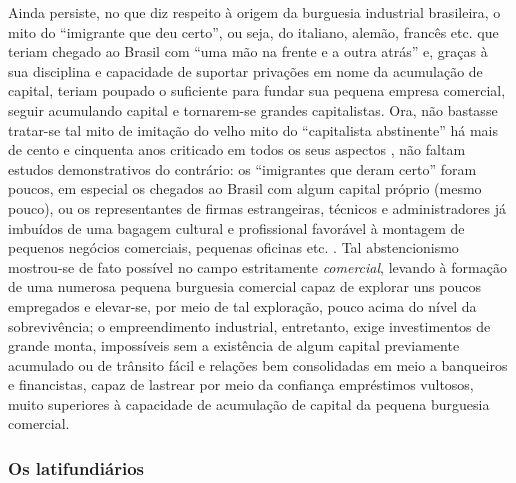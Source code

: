 Ainda persiste, no que diz respeito à origem da burguesia industrial brasileira, o mito do ``imigrante que deu certo'', ou seja, do italiano, alemão, francês etc. que teriam chegado ao Brasil com ``uma mão na frente e a outra atrás'' e, graças à sua disciplina e capacidade de suportar privações em nome da acumulação de capital, teriam poupado o suficiente para fundar sua pequena empresa comercial, seguir acumulando capital e tornarem-se grandes capitalistas. Ora, não bastasse tratar-se tal mito de imitação do velho mito do ``capitalista abstinente'' há mais de cento e cinquenta anos criticado em todos os seus aspectos \cite[pp.~689-697]{marx_capital1vol2_2001}, não faltam estudos demonstrativos do contrário: os ``imigrantes que deram certo'' foram poucos, em especial os chegados ao Brasil com algum capital próprio (mesmo pouco), ou os representantes de firmas estrangeiras, técnicos e administradores já imbuídos de uma bagagem cultural e profissional favorável à montagem de pequenos negócios comerciais, pequenas oficinas etc. \cite{dean_indussp_1971,gorender_burguesia_1990}. Tal abstencionismo mostrou-se de fato possível no campo estritamente \textit{comercial}, levando à formação de uma numerosa pequena burguesia comercial capaz de explorar uns poucos empregados e elevar-se, por meio de tal exploração, pouco acima do nível da sobrevivência; o empreendimento industrial, entretanto, exige investimentos de grande monta, impossíveis sem a existência de algum capital previamente acumulado ou de trânsito fácil e relações bem consolidadas em meio a banqueiros e financistas, capaz de lastrear por meio da confiança empréstimos vultosos, muito superiores à capacidade de acumulação de capital da pequena burguesia comercial.

\subsubsection{Os latifundiários}\label{subsubsec:clagraris}

